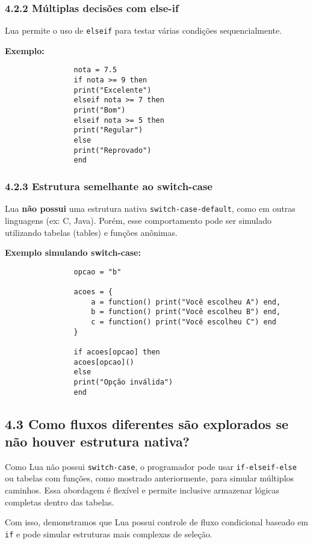 \documentclass[12pt,a4paper]{article}
\begin{document}
			\subsubsection*{4.2.2 Múltiplas decisões com else-if}
			
			Lua permite o uso de \verb|elseif| para testar várias condições sequencialmente.
			
			\textbf{Exemplo:}
			\begin{verbatim}
				nota = 7.5
				if nota >= 9 then
				print("Excelente")
				elseif nota >= 7 then
				print("Bom")
				elseif nota >= 5 then
				print("Regular")
				else
				print("Reprovado")
				end
			\end{verbatim}
			
			\subsubsection*{4.2.3 Estrutura semelhante ao switch-case}
			
			Lua \textbf{não possui} uma estrutura nativa \texttt{switch-case-default}, como em outras linguagens (ex: C, Java). Porém, esse comportamento pode ser simulado utilizando tabelas (tables) e funções anônimas.
			
			\textbf{Exemplo simulando switch-case:}
			\begin{verbatim}
				opcao = "b"
				
				acoes = {
					a = function() print("Você escolheu A") end,
					b = function() print("Você escolheu B") end,
					c = function() print("Você escolheu C") end
				}
				
				if acoes[opcao] then
				acoes[opcao]()
				else
				print("Opção inválida")
				end
			\end{verbatim}
			
			\subsection*{4.3 Como fluxos diferentes são explorados se não houver estrutura nativa?}
			
			Como Lua não possui \verb|switch-case|, o programador pode usar \verb|if-elseif-else| ou tabelas com funções, como mostrado anteriormente, para simular múltiplos caminhos. Essa abordagem é flexível e permite inclusive armazenar lógicas completas dentro das tabelas.
			
			
			Com isso, demonstramos que Lua possui controle de fluxo condicional baseado em \texttt{if} e pode simular estruturas mais complexas de seleção.
			\newpage
			
\end{document}
